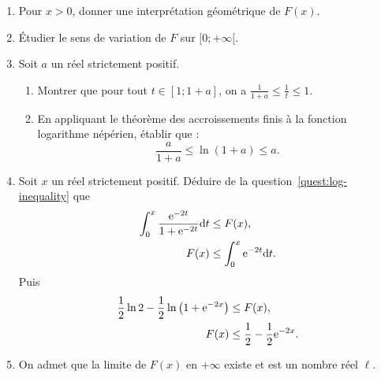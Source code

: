 \begin{exo}
\begin{description}
                  \begin{enumerate}
                        \item Pour $x > 0$, donner une interpr\'etation g\'eom\'etrique de $F(x)$.
                        \item \'Etudier le sens de variation de $F$ sur $[0 ; +\infty[$.
                        \item Soit $a$ un r\'eel strictement positif. \label{quest:log-inequality}
                              \begin{enumerate}
                                    \item Montrer que pour tout $t \in [1 ; 1 + a ]$, on a 
                                          $\frac{1}{1+a} \leq \frac{1}{t} \leq 1$.
                                    \item En appliquant le th\'eor\`eme des accroissements finis
                                          \`a la fonction logarithme n\'ep\'erien, \'etablir que : 
                                          \[
                                                \frac{a}{1+a} \leq \ln (1 + a ) \leq a .
                                          \]
                              \end{enumerate}
                        \item Soit $x$ un r\'eel strictement positif.
                              D\'eduire de la question~\ref{quest:log-inequality} que 
                              \[
                                \begin{aligned}
                                  \int_{0}^{x}\frac{\mathrm{e}^{-2t}}{1+\mathrm{e}^{-2t}}\mathrm{d}t
                                  &\leq F(x), \\
                                  F(x) &\leq \int_{0}^{x}\mathrm{e}^{-2t}\mathrm{d}t.
                                \end{aligned}
                              \]
                              Puis
                              \[
                                \begin{aligned}
                                  \frac{1}{2}\ln 2
                                  -\frac{1}{2}\ln\left(1+\mathrm{e}^{-2x}\right)
                                  &\leq F(x), \\
                                  F(x) &\leq \frac{1}{2}-\frac{1}{2}\mathrm{e}^{-2x}.
                                \end{aligned}
                              \]
                        \item On admet que la limite de $F(x)$ en $+\infty$ existe et est un nombre r\'eel $\ell$.

\end{enumerate}
\end{description}
\end{exo}

